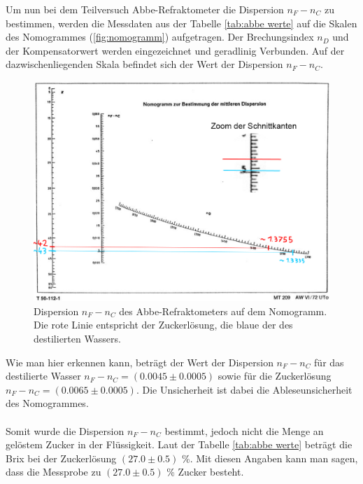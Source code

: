 \documentclass[12pt,a4paper,twoside]{article}
\begin{document}
\noindent
Um nun bei dem Teilversuch Abbe-Refraktometer die Dispersion $n_F-n_C$ zu bestimmen, werden die Messdaten aus der Tabelle \ref{tab:abbe werte} auf die Skalen des Nomogrammes (\ref{fig:nomogramm}) aufgetragen. 
Der Brechungsindex $n_D$ und der Kompensatorwert werden eingezeichnet und geradlinig Verbunden. 
Auf der dazwischenliegenden Skala befindet sich der Wert der Dispersion $n_F-n_C$. 

\begin{figure}[H]
    \centering
    \includegraphics[width=0.6\linewidth]{nudes/nomogramm_auswertung.jpg}
    \caption{Dispersion $n_F-n_C$ des Abbe-Refraktometers auf dem Nomogramm. Die rote Linie entspricht der Zuckerlösung, die blaue der des destilierten Wassers. }
    \label{fig:nomogramm_auswertung}
\end{figure}

\noindent
Wie man hier erkennen kann, beträgt der Wert der Dispersion $n_F-n_C$ für das destilierte Wasser $n_F-n_C = (0.0045 \pm 0.0005)$ sowie für die Zuckerlösung $n_F-n_C = (0.0065 \pm 0.0005)$. 
Die Unsicherheit ist dabei die Ableseunsicherheit des Nomogrammes. 
\\
\\
Somit wurde die Dispersion $n_F-n_C$ bestimmt, jedoch nicht die Menge an gelöstem Zucker in der Flüssigkeit. 
Laut der Tabelle \ref{tab:abbe werte} beträgt die Brix bei der Zuckerlösung $(27.0 \pm 0.5)$ \%.  
Mit diesen Angaben kann man sagen, dass die Messprobe zu $(27.0 \pm 0.5)$ \% Zucker besteht. 
\end{document}
